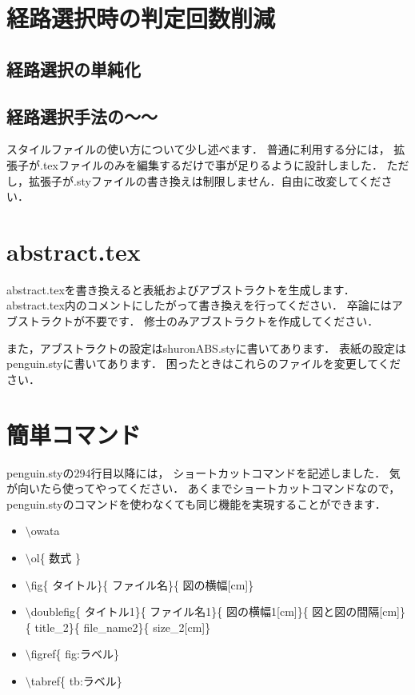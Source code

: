 \section{経路選択時の判定回数削減}

\subsection{経路選択の単純化}

\subsection{経路選択手法の～～}




スタイルファイルの使い方について少し述べます．
普通に利用する分には，
拡張子が.texファイルのみを編集するだけで事が足りるように設計しました．
ただし，拡張子が.styファイルの書き換えは制限しません．自由に改変してください．


\section{abstract.tex}
abstract.texを書き換えると表紙およびアブストラクトを生成します．
abstract.tex内のコメントにしたがって書き換えを行ってください．
卒論にはアブストラクトが不要です．
修士のみアブストラクトを作成してください．

また，アブストラクトの設定はshuronABS.styに書いてあります．
表紙の設定はpenguin.styに書いてあります．
困ったときはこれらのファイルを変更してください．

\section{簡単コマンド}

penguin.styの294行目以降には， ショートカットコマンドを記述しました．
気が向いたら使ってやってください．
あくまでショートカットコマンドなので，
penguin.styのコマンドを使わなくても同じ機能を実現することができます．

\begin{itemize}
\item $\setminus$owata
\item $\setminus$ol\{ 数式 \}
\item $\setminus$fig\{ タイトル\}\{ ファイル名\}\{ 図の横幅[cm]\}
\item $\setminus$doublefig\{ タイトル1\}\{ ファイル名1\}\{ 図の横幅1[cm]\}\{ 図と図の間隔[cm]\}\{ title\_2\}\{ file\_name2\}\{ size\_2[cm]\}
\item $\setminus$figref\{ fig:ラベル\}
\item $\setminus$tabref\{ tb:ラベル\}
\end{itemize}


